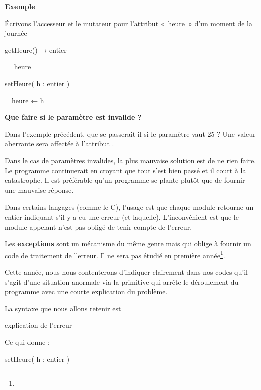 {\bfseries
Exemple}

{
Écrivons l'accesseur et le mutateur pour
l'attribut «~heure~» d'un moment de
la journée}

{\sffamily
{} getHeure() → entier}

{\sffamily
\ \  heure}

{\sffamily
{}\textbf{ }}


\bigskip

{\sffamily
{} setHeure( h : entier )}

{\sffamily
\ \ heure ← h}

{\sffamily
{}\textbf{ }}

{\sffamily\bfseries\upshape
Que faire si le paramètre est invalide ? }

{
Dans l'exemple précédent, que se passerait-il si le
paramètre  vaut 25 ? Une valeur aberrante sera
affectée à l'attribut .}

{
Dans le cas de paramètres invalides, la plus mauvaise solution est de ne
rien faire. Le programme continuerait en croyant que tout s’est bien
passé et il court à la catastrophe. Il est préférable qu’un programme
se plante plutôt que de fournir une mauvaise réponse. }

{
Dans certains langages (comme le C), l’usage est que chaque module
retourne un entier indiquant s'il y a eu une erreur
(et laquelle). L’inconvénient est que le module appelant n’est pas
obligé de tenir compte de l’erreur.}

{
Les \textbf{exceptions} sont un mécanisme du même genre mais qui oblige
à fournir un code de traitement de l’erreur. Il ne sera pas étudié en
première année\footnote{}.
}

{
Cette année, nous nous contenterons d'indiquer
clairement dans nos codes qu'il
s'agit d'une situation anormale via
la primitive  qui arrête le déroulement du
programme avec une courte explication du problème.}

{
La syntaxe que nous allons retenir est}

{\sffamily
{} {\textquotedbl}explication de
l'erreur{\textquotedbl}}

{
Ce qui donne :}

{\sffamily
{} setHeure( h : entier )}

